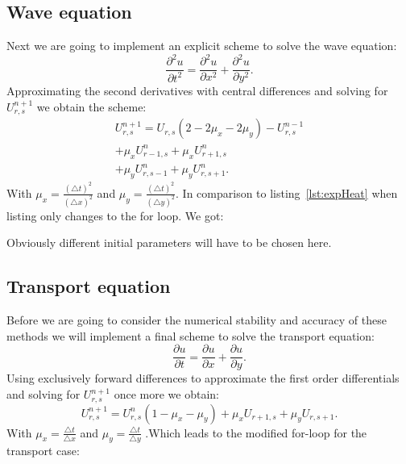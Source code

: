 \subsection{Wave equation}
Next we are going to implement an explicit scheme to solve the wave equation:
\begin{equation}
\frac{\partial^2 u}{\partial t^2} = \frac{\partial^2 u}{\partial x^2} + \frac{\partial^2 u}{\partial y^2}.
\end{equation}
Approximating the second derivatives with central differences and solving for $U_{r,s}^{n+1}$ we obtain the scheme:
\begin{align*}
U_{r,s}^{n+1} = U_{r,s}(2 - 2\mu_x - 2 \mu_y) - U_{r,s}^{n-1} \\
				 + \mu_x U_{r-1,s}^n + \mu_x U_{r+1,s}^n	  \\
				 + \mu_y U_{r,s-1}^n + \mu_y U_{r,s+1}^n.
\end{align*}
With $\mu_x = \frac{(\triangle t)^2}{(\triangle x)^2} $ and $\mu_y = \frac{(\triangle t)^2}{(\triangle y)^2} $. In comparison to listing~\ref{lst:expHeat} when listing only changes to the for loop. We got:

Obviously different initial parameters will have to be chosen here.


\subsection{Transport equation}
Before we are going to consider the numerical stability and accuracy of these methods we will implement a final scheme to solve the transport equation:
\begin{equation}
\frac{\partial u}{\partial t} = \frac{\partial u}{\partial x} + \frac{\partial u}{\partial y}.
\end{equation} 
Using exclusively forward differences to approximate the first order differentials and solving for $U_{r,s}^{n+1}$ once more we obtain:
\begin{equation}
U_{r,s}^{n+1} = U_{r,s}^n (1 - \mu_x - \mu_y) + \mu_x U_{r+1,s} + \mu_y U_{r,s+1}.
\end{equation}
With $\mu_x = \frac{\triangle t}{\triangle x} $ and $\mu_y = \frac{\triangle t}{\triangle y} $ .Which leads to the modified for-loop for the transport case:



